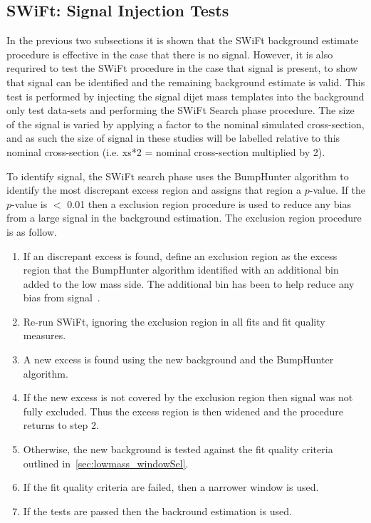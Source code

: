 \FloatBarrier

\subsection{SWiFt: Signal Injection Tests}
\label{sec:SWiFt_signalInj}


In the previous two subsections it is shown that the SWiFt background estimate procedure is effective in the case that there is no signal.
However, it is also requrired to test the SWiFt procedure in the case that signal is present, to show that signal can be identified and the remaining background estimate is valid.
This test is performed by injecting the signal dijet mass templates into the background only test data-sets and performing the SWiFt Search phase procedure.
The size of the signal is varied by applying a factor to the nominal simulated cross-section,
and as such the size of signal in these studies will be labelled relative to this nominal cross-section (i.e. xs*2 = nominal cross-section multiplied by 2).

To identify signal,
the SWiFt search phase uses the {\sc BumpHunter} algorithm to identify the most discrepant excess region and assigns that region a \mbox{$p$-value}.
If the \mbox{$p$-value} is $<$ 0.01 then a exclusion region procedure is used to reduce any bias from a large signal in the background estimation.
The exclusion region procedure is as follow.
\begin{enumerate}[leftmargin=*]
\item If an discrepant excess is found, define an exclusion region as the excess
  region that the {\sc BumpHunter} algorithm identified with an additional bin added to the low mass side.
  The additional bin has been to help reduce any bias from signal~\cite{dijet-mori16_paper}.
\item Re-run SWiFt, ignoring the exclusion region in all fits and fit quality measures.
\item A new excess is found using the new background and the {\sc BumpHunter} algorithm.
\item If the new excess is not covered by the exclusion region then signal was not fully excluded.
  Thus the excess region is then widened and the procedure returns to step 2.
\item Otherwise, the new background is tested against the fit quality criteria outlined in~\ref{sec:lowmass_windowSel}.
\item If the fit quality criteria are failed, then a narrower window is used.
\item If the tests are passed then the backround estimation is used.
\end{enumerate}
 
